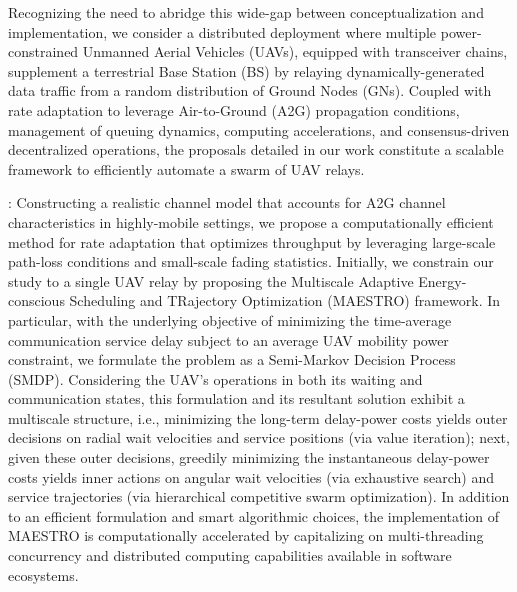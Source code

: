 \documentclass[12pt, draftcls, onecolumn]{IEEEtran}
\theoremstyle{plain}
\theoremstyle{definition}
\theoremstyle{remark}
\begin{document}
Recognizing the need to abridge this wide-gap between conceptualization and implementation, we consider a distributed deployment where multiple power-constrained Unmanned Aerial Vehicles (UAVs), equipped with transceiver chains, supplement a terrestrial Base Station (BS) by relaying dynamically-generated data traffic from a random distribution of Ground Nodes (GNs). Coupled with rate adaptation to leverage Air-to-Ground (A2G) propagation conditions, management of queuing dynamics, computing accelerations, and consensus-driven decentralized operations, the proposals detailed in our work constitute a scalable framework to efficiently automate a swarm of UAV relays.

: Constructing a realistic channel model that accounts for A2G channel characteristics in highly-mobile settings, we propose a computationally efficient method for rate adaptation that optimizes throughput by leveraging large-scale path-loss conditions and small-scale fading statistics. Initially, we constrain our study to a single UAV relay by proposing the Multiscale Adaptive Energy-conscious Scheduling and TRajectory Optimization (MAESTRO) framework. In particular, with the underlying objective of minimizing the time-average communication service delay subject to an average UAV mobility power constraint, we formulate the problem as a Semi-Markov Decision Process (SMDP). Considering the UAV's operations in both its waiting and communication states, this formulation and its resultant solution exhibit a multiscale structure, i.e., minimizing the long-term delay-power costs yields outer decisions on radial wait velocities and service positions (via value iteration); next, given these outer decisions, greedily minimizing the instantaneous delay-power costs yields inner actions on angular wait velocities (via exhaustive search) and service trajectories (via hierarchical competitive swarm optimization). In addition to an efficient formulation and smart algorithmic choices, the implementation of MAESTRO is computationally accelerated by capitalizing on multi-threading concurrency and distributed computing capabilities available in software ecosystems. 
\end{document}
